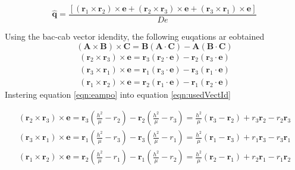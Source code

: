 \documentclass[12pt]{article}
\begin{document}
	\begin{equation}
	\hat { \mathbf { q } } = \frac { \left[ \left( \mathbf { r } _ { 1 } \times \mathbf { r } _ { 2 } \right) \times \mathbf { e } + \left( \mathbf { r } _ { 2 } \times \mathbf { r } _ { 3 } \right) \times \mathbf { e } + \left( \mathbf { r } _ { 3 } \times \mathbf { r } _ { 1 } \right) \times \mathbf { e } \right] } { D e } 
	\end{equation}
	
	Using the bac-cab vector idendity, the following euqations ar eobtained
	\begin{equation}
	( \mathbf { A } \times \mathbf { B } ) \times \mathbf { C }  = \mathbf { B } ( \mathbf { A } \cdot \mathbf { C } ) - \mathbf { A } ( \mathbf { B } \cdot \mathbf { C } )
	\end{equation}
	\begin{eqnarray}
	{ \left( \mathbf { r } _ { 2 } \times \mathbf { r } _ { 3 } \right) \times \mathbf { e } = \mathbf { r } _ { 3 } \left( \mathbf { r } _ { 2 } \cdot \mathbf { e } \right) - \mathbf { r } _ { 2 } \left( \mathbf { r } _ { 3 } \cdot \mathbf { e } \right) } \\ { \left( \mathbf { r } _ { 3 } \times \mathbf { r } _ { 1 } \right) \times \mathbf { e } = \mathbf { r } _ { 1 } \left( \mathbf { r } _ { 3 } \cdot \mathbf { e } \right) - \mathbf { r } _ { 3 } \left( \mathbf { r } _ { 1 } \cdot \mathbf { e } \right) } \\ { \left( \mathbf { r } _ { 1 } \times \mathbf { r } _ { 2 } \right) \times \mathbf { e } = \mathbf { r } _ { 2 } \left( \mathbf { r } _ { 1 } \cdot \mathbf { e } \right) - \mathbf { r } _ { 1 } \left( \mathbf { r } _ { 2 } \cdot \mathbf { e } \right) } 
	\label{eqn:usedVectId}
	\end{eqnarray}
	Instering equation \ref{eqn:eampo} into equation \ref{eqn:usedVectId}  
	
	\begin{eqnarray}
	\left( \mathbf { r } _ { 2 } \times \mathbf { r } _ { 3 } \right) \times \mathbf { e } = \mathbf { r } _ { 3 } \left( \frac { h ^ { 2 } } { \mu } - r _ { 2 } \right) - \mathbf { r } _ { 2 } \left( \frac { h ^ { 2 } } { \mu } - r _ { 3 } \right) = \frac { h ^ { 2 } } { \mu } \left( \mathbf { r } _ { 3 } - \mathbf { r } _ { 2 } \right) + r _ { 3 } \mathbf { r } _ { 2 } - r _ { 2 } \mathbf { r } _ { 3 }\\
	\left( \mathbf { r } _ { 3 } \times \mathbf { r } _ { 1 } \right) \times \mathbf { e } = \mathbf { r } _ { 1 } \left( \frac { h ^ { 2 } } { \mu } - r _ { 3 } \right) - \mathbf { r } _ { 3 } \left( \frac { h ^ { 2 } } { \mu } - r _ { 1 } \right) = \frac { h ^ { 2 } } { \mu } \left( \mathbf { r } _ { 1 } - \mathbf { r } _ { 3 } \right) + r _ { 1 } \mathbf { r } _ { 3 } - r _ { 3 } \mathbf { r } _ { 1 }\\
	\left( \mathbf { r } _ { 1 } \times \mathbf { r } _ { 2 } \right) \times \mathbf { e } = \mathbf { r } _ { 2 } \left( \frac { h ^ { 2 } } { \mu } - r _ { 1 } \right) - \mathbf { r } _ { 1 } \left( \frac { h ^ { 2 } } { \mu } - r _ { 2 } \right) = \frac { h ^ { 2 } } { \mu } \left( \mathbf { r } _ { 2 } - \mathbf { r } _ { 1 } \right) + r _ { 2 } \mathbf { r } _ { 1 } - r _ { 1 } \mathbf { r } _ { 2 }
	\end{eqnarray}
	
\end{document}
